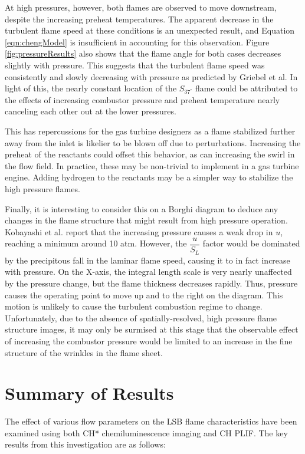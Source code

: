 At high pressures, however, both flames are observed to move downstream, despite the increasing preheat temperatures.
The apparent decrease in the turbulent flame speed at these conditions is an unexpected result, and Equation \ref{eqn:chengModel} is insufficient in accounting for this observation.
Figure \ref{fig:pressureResults} also shows that the flame angle for both cases decreases slightly with pressure.
This suggests that the turbulent flame speed was consistently and slowly decreasing with pressure as predicted by Griebel et al.
In light of this, the nearly constant location of the \(S_{37^\circ}\) flame could be attributed to the effects of increasing combustor pressure and preheat temperature nearly canceling each other out at the lower pressures.

This has repercussions for the gas turbine designers as a flame stabilized further away from the inlet is likelier to be blown off due to perturbations.
Increasing the preheat of the reactants could offset this behavior, as can increasing the swirl in the flow field.
In practice, these may be non-trivial to implement in a gas turbine engine.
Adding hydrogen to the reactants may be a simpler way to stabilize the high pressure flames.

Finally, it is interesting to consider this on a Borghi diagram to deduce any changes in the flame structure that might result from high pressure operation.
Kobayashi et al.\cite{1997-kobayashi} report that the increasing pressure causes a weak drop in \(u\), reaching a minimum around 10 atm.
However, the \(\dfrac{ u }{ S_L }\) factor would be dominated by the precipitous fall in the laminar flame speed, causing it to in fact increase with pressure.
On the X-axis, the integral length scale is very nearly unaffected by the pressure change, but the flame thickness decreases rapidly.
Thus, pressure causes the operating point to move up and to the right on the diagram.
This motion is unlikely to cause the turbulent combustion regime to change.
Unfortunately, due to the absence of spatially-resolved, high pressure flame structure images, it may only be surmised at this stage that the observable effect of increasing the combustor pressure would be limited to an increase in the fine structure of the wrinkles in the flame sheet.

\section{Summary of Results}

The effect of various flow parameters on the LSB flame characteristics have been examined using both CH* chemiluminescence imaging and CH PLIF.
The key results from this investigation are as follows:

